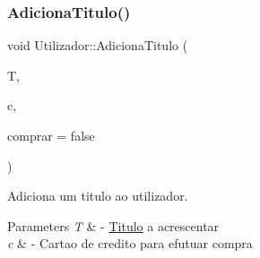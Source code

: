 \subsubsection{\texorpdfstring{Adiciona\+Titulo()}{AdicionaTitulo()}}
{\footnotesize\ttfamily void Utilizador\+::\+Adiciona\+Titulo (\begin{DoxyParamCaption}\item[{\hyperlink{classTitulo}{Titulo} $\ast$}]{T,  }\item[{\hyperlink{classCartaoCredito}{Cartao\+Credito} \&}]{c,  }\item[{bool}]{comprar = {\ttfamily false} }\end{DoxyParamCaption})}



Adiciona um titulo ao utilizador. 


\begin{DoxyParams}{Parameters}
{\em T} & -\/ \hyperlink{classTitulo}{Titulo} a acrescentar \\
\hline
{\em c} & -\/ Cartao de credito para efutuar compra \\
\hline
\end{DoxyParams}


